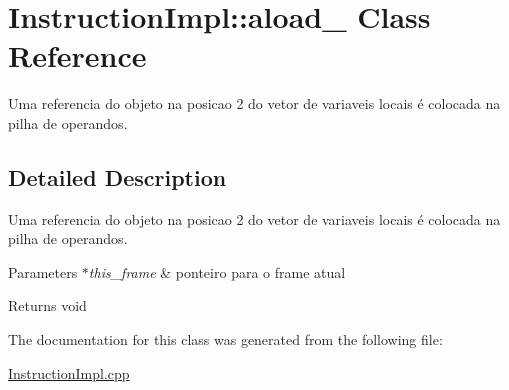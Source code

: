 \hypertarget{class_instruction_impl_1_1aload__2}{}\section{Instruction\+Impl\+:\+:aload\+\_ Class Reference}
\label{class_instruction_impl_1_1aload__2}


Uma referencia do objeto na posicao 2 do vetor de variaveis locais é colocada na pilha de operandos.  




\subsection{Detailed Description}
Uma referencia do objeto na posicao 2 do vetor de variaveis locais é colocada na pilha de operandos. 


\begin{DoxyParams}{Parameters}
{\em $\ast$this\+\_\+frame} & ponteiro para o frame atual \\
\hline
\end{DoxyParams}
\begin{DoxyReturn}{Returns}
void 
\end{DoxyReturn}


The documentation for this class was generated from the following file\+:\begin{DoxyCompactItemize}
\item 
\hyperlink{_instruction_impl_8cpp}{Instruction\+Impl.\+cpp}\end{DoxyCompactItemize}
